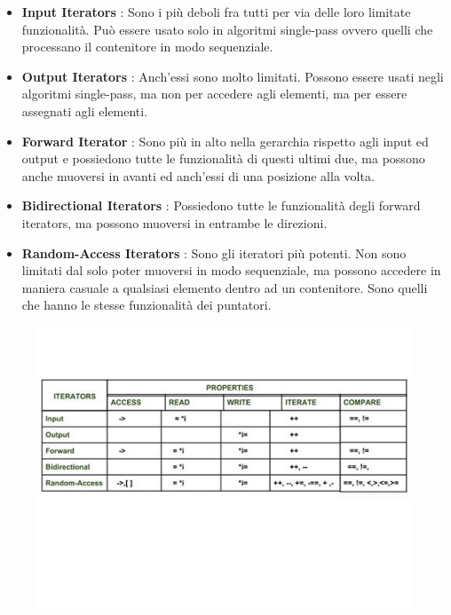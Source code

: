 \begin{itemize}
	\item \textsf{\small \textbf{Input Iterators} : Sono i più deboli fra tutti per via delle loro limitate funzionalità. Può essere usato solo in algoritmi single-pass ovvero quelli che processano il contenitore in modo sequenziale.}
	\item \textsf{\small \textbf{Output Iterators} : Anch'essi sono molto limitati. Possono essere usati negli algoritmi single-pass, ma non per accedere agli elementi, ma per essere assegnati agli elementi.}
	\item \textsf{\small \textbf{Forward Iterator} : Sono più in alto nella gerarchia rispetto agli input ed output e possiedono tutte le funzionalità di questi ultimi due, ma possono anche muoversi in avanti ed anch'essi di una posizione alla volta.}
	\item \textsf{\small \textbf{Bidirectional Iterators} : Possiedono tutte le funzionalità degli forward iterators, ma possono muoversi in entrambe le direzioni.}
	\item \textsf{\small \textbf{Random-Access Iterators} : Sono gli iteratori più potenti. Non sono limitati dal solo poter muoversi in modo sequenziale, ma possono accedere in maniera casuale a qualsiasi elemento dentro ad un contenitore. Sono quelli che hanno le stesse funzionalità dei puntatori.}
\end{itemize}

\pagebreak

\begin{figure}[H]
	\centering
	\includegraphics[width=1.2\textwidth, height=1.2\textheight, keepaspectratio]{./imgs/iterators.jpg}
	\label{fig:iterators}
\end{figure}


